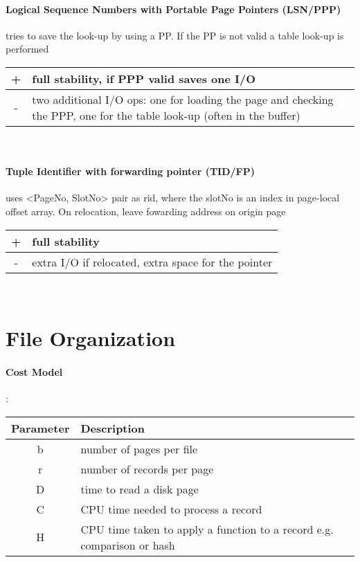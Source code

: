 \paragraph{Logical Sequence Numbers with Portable Page Pointers (LSN/PPP)} tries to save the look-up by using a PP. If the PP is not valid a table look-up is performed\\
\begin{tabular}{c|p{6cm}} \hline
     + & full stability, if PPP valid saves one I/O \\ \hline
     - & two additional I/O ops: one for loading the page and checking the PPP, one for the table look-up (often in the buffer)
\end{tabular} \\

\paragraph{Tuple Identifier with forwarding pointer (TID/FP)} uses <PageNo, SlotNo> pair as rid, where the slotNo is an index in page-local offset array. On relocation, leave fowarding address on origin page \\
\begin{tabular}{c|p{6cm}} \hline
     + & full stability \\ \hline
     - & extra I/O if relocated, extra space for the pointer
\end{tabular} \\

\section{File Organization}
\paragraph{Cost Model}: \\
\begin{tabular}{|c|p{6cm}|} \hline
    Parameter & Description \\ \hline
     b & number of pages per file \\ \hline
     r & number of records per page \\ \hline
     D & time to read a disk page \\ \hline
     C & CPU time needed to process a record \\ \hline
     H & CPU time taken to apply a function to a record e.g. comparison or hash \\ \hline
\end{tabular} \\

